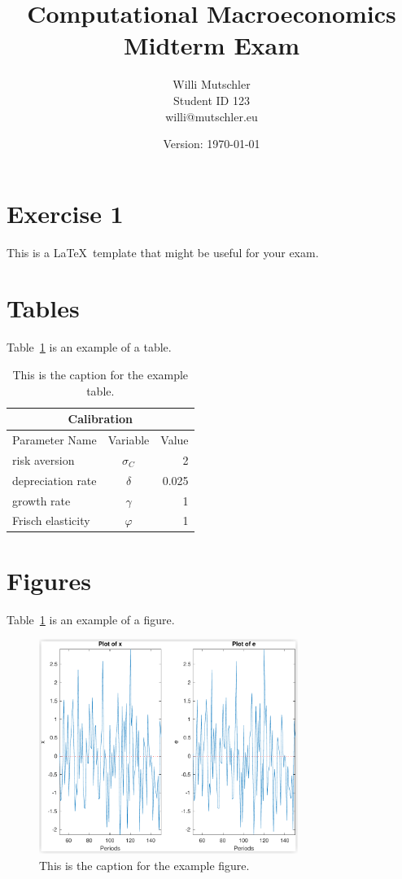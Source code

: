 \documentclass[a4paper]{scrartcl}
\begin{document}
\title{Computational Macroeconomics\\Midterm Exam}
\author{Willi Mutschler\\Student ID 123\\willi@mutschler.eu}
\date{Version: \today}
\maketitle\thispagestyle{empty}

\newpage
\tableofcontents\thispagestyle{empty}\newpage \setcounter{page}{1}

\section{Exercise 1}\label{sec:introduction}
This is a \LaTeX~template that might be useful for your exam.

\section{Tables}
Table~\ref{tbl:1} is an example of a table.
\begin{table}[h!]
\centering
\begin{tabular}{lcr}
\multicolumn{3}{c}{Calibration}
\\
\toprule
Parameter Name & Variable & Value
\\
\midrule
risk aversion & \(\sigma_C \) & 2
\\
depreciation rate & \(\delta \) & 0.025
\\
growth rate & \(\gamma \) & 1
\\
Frisch elasticity & \(\varphi \) & 1
\\
\bottomrule
\end{tabular}
\caption{This is the caption for the example table.\label{tbl:1}}
\end{table}

\section{Figures}
Table~\ref{fig:1} is an example of a figure.
\begin{figure}[t!]\centering
\includegraphics[width=0.75\textwidth]{../../plots/SimulatedTrajectory_x.pdf}
\caption{This is the caption for the example figure.\label{fig:1}}
\end{figure}
\end{document}
